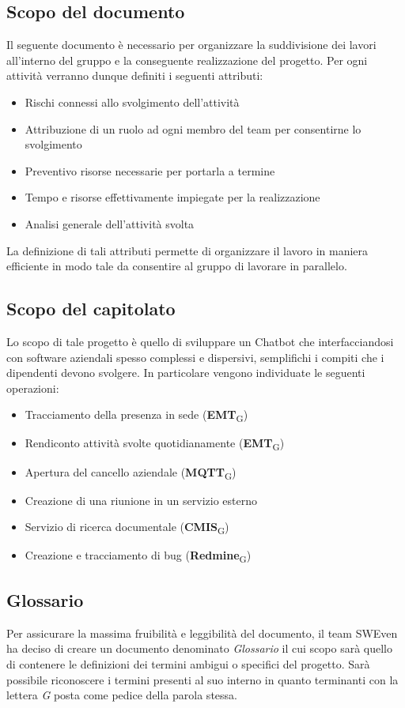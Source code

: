 \subsection{Scopo del documento}
Il seguente documento è necessario per organizzare la suddivisione dei lavori all'interno del gruppo e la conseguente realizzazione del progetto. Per ogni attività verranno dunque definiti i seguenti attributi: 
\begin{itemize}
    \item Rischi connessi allo svolgimento dell'attività
    \item Attribuzione di un ruolo ad ogni membro del team per consentirne lo svolgimento
    \item Preventivo risorse necessarie per portarla a termine
    \item Tempo e risorse effettivamente impiegate per la realizzazione
    \item Analisi generale dell'attività svolta
\end{itemize}
La definizione di tali attributi permette di organizzare il lavoro in maniera efficiente in modo tale da consentire al gruppo di lavorare in parallelo. 

\subsection{Scopo del capitolato}
Lo scopo di tale progetto è quello di sviluppare un Chatbot che interfacciandosi con software aziendali spesso complessi e dispersivi, semplifichi i compiti che i dipendenti devono svolgere. In particolare vengono individuate le seguenti operazioni: 
\begin{itemize}
    \item Tracciamento della presenza in sede (\textbf{EMT}\textsubscript{G})
    \item Rendiconto attività svolte quotidianamente (\textbf{EMT}\textsubscript{G})
    \item Apertura del cancello aziendale (\textbf{MQTT}\textsubscript{G})
    \item Creazione di una riunione in un servizio esterno
    \item Servizio di ricerca documentale (\textbf{CMIS}\textsubscript{G})
    \item Creazione e tracciamento di bug (\textbf{Redmine}\textsubscript{G})
\end{itemize}

\subsection{Glossario}
Per assicurare la massima fruibilità e leggibilità del documento, il team SWEven ha deciso di creare un documento denominato \textit{Glossario} il cui scopo sarà quello di contenere le definizioni dei termini ambigui o specifici del progetto. Sarà possibile riconoscere i termini presenti al suo interno in quanto terminanti con la lettera \textit{G} posta come pedice della parola stessa. 
